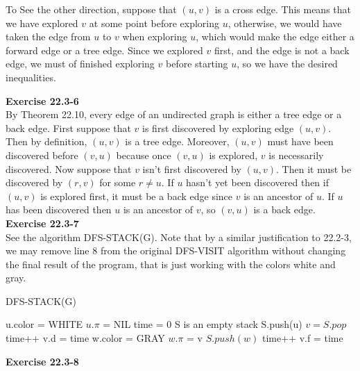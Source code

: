 \documentclass{article}
\begin{document}
\begin{enumerate}[a.]
To See the other direction, suppose that $(u,v)$ is a cross edge. This means that we have explored $v$ at some point before exploring $u$, otherwise, we would have taken the edge from $u$ to $v$ when exploring $u$, which would make the edge either a forward edge or a tree edge. Since we explored $v$ first, and the edge is not a back edge, we must of finished exploring $v$ before starting $u$, so we have the desired inequalities.


\end{enumerate}

\noindent\textbf{Exercise 22.3-6}\\

By Theorem 22.10, every edge of an undirected graph is either a tree edge or a back edge.  First suppose that $v$ is first discovered by exploring edge $(u,v)$.  Then by definition, $(u,v)$ is a tree edge.  Moreover, $(u,v)$ must have been discovered before $(v,u)$ because once $(v,u)$ is explored, $v$ is necessarily discovered.  Now suppose that $v$ isn't first discovered by $(u,v)$.  Then it must be discovered by $(r,v)$ for some $r \neq u$.  If $u$ hasn't yet been discovered then if $(u,v)$ is explored first, it must be a back edge since $v$ is an ancestor of $u$. If $u$ has been discovered then $u$ is an ancestor of $v$, so $(v,u)$ is a back edge. \\

\noindent\textbf{Exercise 22.3-7}\\

See the algorithm DFS-STACK(G). Note that by a similar justification to 22.2-3, we may remove line 8 from the original DFS-VISIT algorithm without changing the final result of the program, that is just working with the colors white and gray.
\begin{algorithm}
\caption{DFS-STACK(G)}
\begin{algorithmic}
\State u.color = WHITE
\State $u.\pi$ = NIL
\EndFor
\State time = 0
\State S is an empty stack
\State S.push(u)
\State $v = S.pop$
\State time++
\State v.d = time
\State w.color = GRAY
\State $w.\pi$ = v
\State $S.push(w)$
\EndIf
\EndFor
\State time++
\State v.f = time
\EndWhile
\EndWhile
\end{algorithmic}
\end{algorithm}

\noindent\textbf{Exercise 22.3-8}\\
\end{document}
